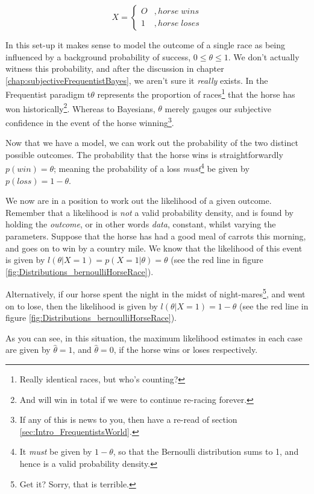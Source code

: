 \documentclass[11pt,fullpage]{book}
\begin{document}
\begin{equation}
X =
\begin{cases}
O & , horse\; wins \\
1 & , horse\; loses
\end{cases}
\end{equation}

In this set-up it makes sense to model the outcome of a single race as being influenced by a background probability of success, $0\leq\theta\leq 1$. We don't actually witness this probability, and after the discussion in chapter \ref{chap:subjectiveFrequentistBayes}, we aren't sure it \textit{really} exists. In the Frequentist paradigm t$\theta$ represents the proportion of races\footnote{Really identical races, but who's counting?} that the horse has won historically\footnote{And will win in total if we were to continue re-racing forever.}. Whereas to Bayesians, $\theta$ merely gauges our subjective confidence in the event of the horse winning\footnote{If any of this is news to you, then have a re-read of section \ref{sec:Intro_FrequentistsWorld}.}.

Now that we have a model, we can work out the probability of the two distinct possible outcomes. The probability that the horse wins is straightforwardly $p(win)=\theta$; meaning the probability of a loss \textit{must}\footnote{It \textit{must} be given by $1-\theta$, so that the Bernoulli distribution sums to 1, and hence is a valid probability density.} be given by $p(loss)=1-\theta$.

We now are in a position to work out the likelihood of a given outcome. Remember that a likelihood is \textit{not} a valid probability density, and is found by holding the \textit{outcome}, or in other words \textit{data}, constant, whilst varying the parameters. Suppose that the horse has had a good meal of carrots this morning, and goes on to win by a country mile. We know that the likelihood of this event is given by $l(\theta|X=1)=p(X=1|\theta)=\theta$ (see the red line in figure \ref{fig:Distributions_bernoulliHorseRace}).

Alternatively, if our horse spent the night in the midst of night-mares\footnote{Get it? Sorry, that is terrible.}, and went on to lose, then the likelihood is given by $l(\theta|X=1)=1-\theta$ (see the red line in figure \ref{fig:Distributions_bernoulliHorseRace}).

As you can see, in this situation, the maximum likelihood estimates in each case are given by $\hat{\theta}=1$, and $\hat{\theta}=0$, if the horse wins or loses respectively.
\end{document}
